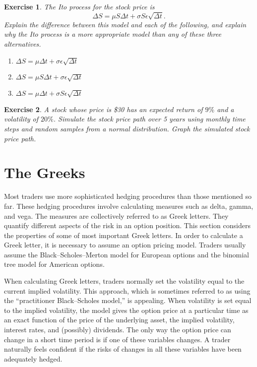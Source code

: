 \documentclass[letterpaper,10pt]{article}
\newtheorem{ex}{Exercise}
\begin{document}
\begin{ex}



 The Ito process for the stock price is $$\Delta S=\mu S\Delta t+\sigma S\epsilon\sqrt{\Delta t}.$$  Explain the difference between this model and each of the following, and explain why the Ito process is a more appropriate model than any of these three alternatives.



\begin{enumerate}
\item[(a)] $\displaystyle \Delta S=\mu\Delta t+\sigma\epsilon\sqrt{\Delta t}$
\item[(b)] $\displaystyle \Delta S=\mu S\Delta t+\sigma\epsilon\sqrt{\Delta t}$
\item[(c)] $\displaystyle \Delta S=\mu \Delta t+\sigma S\epsilon\sqrt{\Delta t}$

\end{enumerate}
\end{ex}


\begin{ex} A stock whose price is \$30 has an expected return of $9\%$ and a volatility of $20\%$.  Simulate the stock price path over 5 years using monthly time steps and random samples from a normal distribution. Graph the simulated stock price path.

\end{ex}



\newpage

\section{The Greeks}


\noindent Most traders use more sophisticated hedging procedures than those mentioned so far.
These hedging procedures involve calculating measures such as delta, gamma, and vega.
The measures are collectively referred to as Greek letters. They quantify different
aspects of the risk in an option position. This section considers the properties of some
of most important Greek letters.
In order to calculate a Greek letter, it is necessary to assume an option pricing
model. Traders usually assume the Black–Scholes–Merton model for European options and the binomial tree model for American options. 

\bigskip

\noindent When calculating Greek letters, traders
normally set the volatility equal to the current implied volatility. This approach, which
is sometimes referred to as using the “practitioner Black–Scholes model,” is appealing.
When volatility is set equal to the implied volatility, the model gives the option price at
a particular time as an exact function of the price of the underlying asset, the implied
volatility, interest rates, and (possibly) dividends. The only way the option price can
change in a short time period is if one of these variables changes. A trader naturally
feels confident if the risks of changes in all these variables have been adequately hedged.
\end{document}
